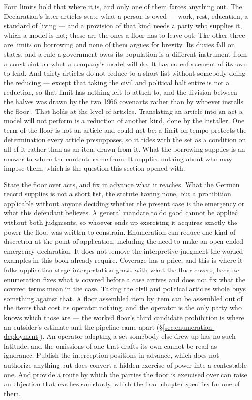Four limits hold that where it is, and only one of them forces anything out. The Declaration's later articles state what a person is owed — work, rest, education, a standard of living — and a provision of that kind needs a party who supplies it, which a model is not; those are the ones a floor has to leave out. The other three are limits on borrowing and none of them argues for brevity. Its duties fall on states, and a rule a government owes its population is a different instrument from a constraint on what a company's model will do. It has no enforcement of its own to lend. And thirty articles do not reduce to a short list without somebody doing the reducing — except that taking the civil and political half entire is not a reduction, so that limit has nothing left to attach to, and the division between the halves was drawn by the two 1966 covenants rather than by whoever installs the floor \autocite{un1966iccpr,un1966icescr}. That holds at the level of articles. Translating an article into an act a model will not perform is a reduction of another kind, done by the installer. One term of the floor is not an article and could not be: a limit on tempo protects the determination every article presupposes, so it rides with the set as a condition on all of it rather than as an item drawn from it. What the borrowing supplies is an answer to where the contents came from. It supplies nothing about who may impose them, which is the question this section opened with.

State the floor over acts, and fix in advance what it reaches. What the German record supplies is not a short list, the statute having none, but a prohibition applicable without anyone deciding whether the present case is the emergency or what this defendant believes. A general mandate to do good cannot be applied without both judgments, so whoever ends up exercising it acquires exactly the power the floor was written to constrain. Enumeration can reduce one kind of discretion at the point of application, including the need to make an open-ended emergency declaration. It does not remove the interpretive judgment the worked examples in this book already require. Coverage has a price, and this is where it falls: application-stage interpretation grows with what the floor covers, because enumeration fixes what is covered before a case arrives and does not fix what the covered terms mean in the case. Taking the civil and political articles whole buys something against that. A floor assembled item by item can be assembled out of the items that cost its operator nothing, and the operator is the only party who knows which those are — the worked floor's third candidate prohibition is where an outsider's estimate and the pipeline came apart (§\ref{sec:enumeration-deployment}). An operator adopting a set somebody else drew up has no such latitude, and the omissions of one that drafts its own cannot be read as ignorance. Publish the interception positions in advance, which does not authorize anything but does convert a hidden exercise of power into a contestable one. And provide a route by which the parties the floor is exercised over can raise an objection that reaches somebody, which the floor chapter specifies
for one of them.

